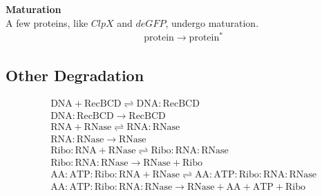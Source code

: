 \documentclass[english]{report}
\begin{document}
\noindent \textbf{Maturation}\\
A few proteins, like $ClpX$ and $deGFP$, undergo maturation. 
\begin{align}
& \mathrm{protein}  \rightarrow \mathrm{protein^*}
\end{align}
\subsection{Other Degradation}

\begin{align}
& \mathrm{DNA} + \mathrm{RecBCD} \rightleftharpoons \mathrm{DNA}\!:\!\mathrm{RecBCD} \\
& \mathrm{DNA}\!:\!\mathrm{RecBCD} \rightarrow \mathrm{RecBCD} \\
& \mathrm{RNA} + \mathrm{RNase} \rightleftharpoons \mathrm{RNA}\!:\!\mathrm{RNase} \\
& \mathrm{RNA}\!:\!\mathrm{RNase} \rightarrow \mathrm{RNase} \\
& \mathrm{Ribo}\!:\!\mathrm{RNA} + \mathrm{RNase} \rightleftharpoons \mathrm{Ribo}\!:\!\mathrm{RNA}\!:\!\mathrm{RNase} \\
& \mathrm{Ribo}\!:\!\mathrm{RNA}\!:\!\mathrm{RNase} \rightarrow \mathrm{RNase} + \mathrm{Ribo} \\
& \mathrm{AA}\!:\!\mathrm{ATP}\!:\!\mathrm{Ribo}\!:\!\mathrm{RNA} + \mathrm{RNase} \rightleftharpoons \mathrm{AA}\!:\!\mathrm{ATP}\!:\!\mathrm{Ribo}\!:\!\mathrm{RNA}\!:\!\mathrm{RNase} \\
&\mathrm{AA}\!:\!\mathrm{ATP}\!:\!\mathrm{Ribo}\!:\!\mathrm{RNA}\!:\!\mathrm{RNase} \rightarrow \mathrm{RNase} + \mathrm{AA} + \mathrm{ATP} + \mathrm{Ribo} 
\end{align}
\end{document}
